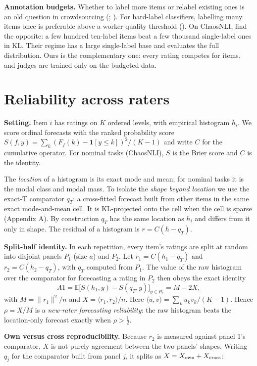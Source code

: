 \documentclass[10pt,twocolumn]{article}
\begin{document}
\textbf{Annotation budgets.} Whether to label more items or relabel existing ones is an old question in crowdsourcing (\citealp{sheng2008get}; \citealp{lin2014relabel}). For hard-label classifiers, labelling many items once is preferable above a worker-quality threshold (\citealp{khetan2018learning}). On ChaosNLI, \citet{zhang2021learning} find the opposite: a few hundred ten-label items beat a few thousand single-label ones in KL. Their regime has a large single-label base and evaluates the full distribution. Ours is the complementary one: every rating competes for items, and judges are trained only on the budgeted data.

\section{Reliability across raters}



\textbf{Setting.} Item \(i\) has ratings on \(K\) ordered levels, with empirical histogram \(h_i\). We score ordinal forecasts with the ranked probability score \(S(f,y)=\sum_k (F_f(k)-\mathbf 1[y\le k])^2/(K-1)\) and write \(C\) for the cumulative operator. For nominal tasks (ChaosNLI), \(S\) is the Brier score and \(C\) is the identity.

The \emph{location} of a histogram is its exact mode and mean; for nominal tasks it is the modal class and modal mass. To isolate the \emph{shape beyond location} we use the exact-T comparator \(q_T\): a cross-fitted forecast built from other items in the same exact mode-and-mean cell. It is KL-projected onto the cell when the cell is sparse (Appendix A). By construction \(q_T\) has the same location as \(h_i\) and differs from it only in shape. The residual of a histogram is \(r = C(h - q_T)\).

\textbf{Split-half identity.} In each repetition, every item's ratings are split at random into disjoint panels \(P_1\) (size \(a\)) and \(P_2\). Let \(r_1 = C(h_1-q_T)\) and \(r_2 = C(h_2-q_T)\), with \(q_T\) computed from \(P_1\). The value of the raw histogram over the comparator for forecasting a rating in \(P_2\) then obeys the exact identity \[A1 = \mathbb E\big[S(h_1,y)-S(q_T,y)\big]_{y\in P_2} = M - 2X,\] with \(M=\|r_1\|^2/n\) and \(X=\langle r_1,r_2\rangle/n\). Here \(\langle u,v\rangle=\sum_k u_k v_k/(K-1)\). Hence \(\rho = X/M\) is a \emph{new-rater forecasting reliability}: the raw histogram beats the location-only forecast exactly when \(\rho>\tfrac12\).

\textbf{Own versus cross reproducibility.} Because \(r_2\) is measured against panel 1's comparator, \(X\) is not purely agreement between the two panels' shapes. Writing \(q_j\) for the comparator built from panel \(j\), it splits as \(X = X_{\rm own} + X_{\rm cross}\):
\end{document}
